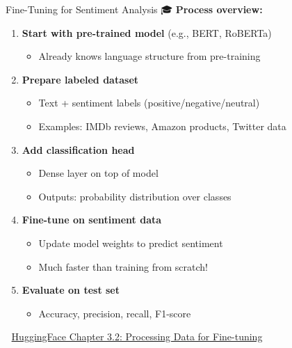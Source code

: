 \documentclass[aspectratio=169]{beamer}
\begin{document}
\begin{frame}[shrink=10]{Fine-Tuning for Sentiment Analysis 🎓}
    \textbf{Process overview:}

    \begin{enumerate}\setlength{\itemsep}{0pt}
        \item \textbf{Start with pre-trained model} (e.g., BERT, RoBERTa)
        \begin{itemize}\setlength{\itemsep}{0pt}
            \item Already knows language structure from pre-training
        \end{itemize}

        \item \textbf{Prepare labeled dataset}
        \begin{itemize}\setlength{\itemsep}{0pt}
            \item Text + sentiment labels (positive/negative/neutral)
            \item Examples: IMDb reviews, Amazon products, Twitter data
        \end{itemize}

        \item \textbf{Add classification head}
        \begin{itemize}\setlength{\itemsep}{0pt}
            \item Dense layer on top of model
            \item Outputs: probability distribution over classes
        \end{itemize}

        \item \textbf{Fine-tune on sentiment data}
        \begin{itemize}\setlength{\itemsep}{0pt}
            \item Update model weights to predict sentiment
            \item Much faster than training from scratch!
        \end{itemize}

        \item \textbf{Evaluate on test set}
        \begin{itemize}\setlength{\itemsep}{0pt}
            \item Accuracy, precision, recall, F1-score
        \end{itemize}
    \end{enumerate}

    📖 \href{https://huggingface.co/learn/nlp-course/chapter3/2}{HuggingFace Chapter 3.2: Processing Data for Fine-tuning}
\end{frame}
\end{document}
